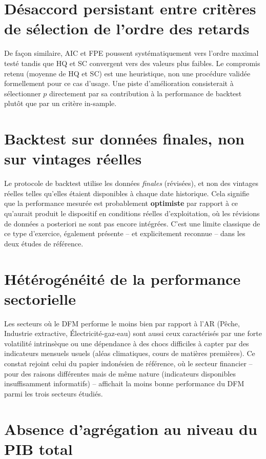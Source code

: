 \documentclass[11pt,a4paper]{report}
\begin{document}
\section{Désaccord persistant entre critères de sélection de l'ordre des retards}

De façon similaire, AIC et FPE poussent systématiquement vers l'ordre maximal testé tandis que HQ et SC convergent vers des valeurs plus faibles. Le compromis retenu (moyenne de HQ et SC) est une heuristique, non une procédure validée formellement pour ce cas d'usage. Une piste d'amélioration consisterait à sélectionner $p$ directement par sa contribution à la performance de backtest plutôt que par un critère in-sample.

\section{Backtest sur données finales, non sur vintages réelles}

Le protocole de backtest utilise les données \emph{finales} (révisées), et non des vintages réelles telles qu'elles étaient disponibles à chaque date historique. Cela signifie que la performance mesurée est probablement \textbf{optimiste} par rapport à ce qu'aurait produit le dispositif en conditions réelles d'exploitation, où les révisions de données a posteriori ne sont pas encore intégrées. C'est une limite classique de ce type d'exercice, également présente -- et explicitement reconnue -- dans les deux études de référence.

\section{Hétérogénéité de la performance sectorielle}

Les secteurs où le DFM performe le moins bien par rapport à l'AR (Pêche, Industrie extractive, Électricité-gaz-eau) sont aussi ceux caractérisés par une forte volatilité intrinsèque ou une dépendance à des chocs difficiles à capter par des indicateurs mensuels usuels (aléas climatiques, cours de matières premières). Ce constat rejoint celui du papier indonésien de référence, où le secteur financier -- pour des raisons différentes mais de même nature (indicateurs disponibles insuffisamment informatifs) -- affichait la moins bonne performance du DFM parmi les trois secteurs étudiés.

\section{Absence d'agrégation au niveau du PIB total}
\end{document}
